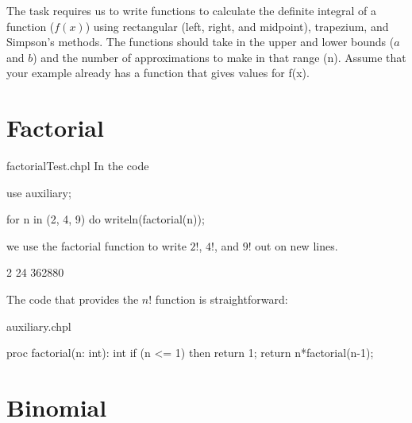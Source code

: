 \label{Numerical_Integration}


The task requires us to write functions to calculate the definite integral of a 
function ($f(x)$) using rectangular (left, right, and midpoint), trapezium, and 
Simpson's methods. The functions should take in the upper and lower bounds ($a$ and $b$) 
and the number of approximations to make in that range (n). Assume that your example already has a function that gives values for f(x).

\section{Factorial}

\begin{chapelexample}{factorialTest.chpl}
In the code
\begin{chapelpre}
use auxiliary;
\end{chapelpre}
\begin{chapel}
for n in (2, 4, 9) do
  writeln(factorial(n));
\end{chapel}
we use the factorial function to write $2!$, $4!$, and $9!$ out on new lines.
\begin{chapelpost}
\end{chapelpost}
\begin{chapeloutput}
2
24
362880
\end{chapeloutput}
\end{chapelexample}

The code that provides the $n!$ function is straightforward:
\begin{chapelsource}{auxiliary.chpl}
\begin{chapel}
proc factorial(n: int): int{
  if (n <= 1) then return 1;
  return n*factorial(n-1);
}
\end{chapel}
\end{chapelsource}

\section{Binomial}

